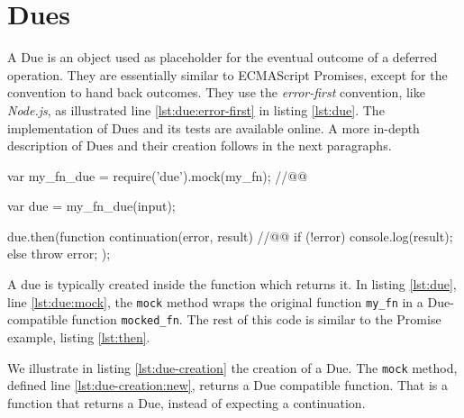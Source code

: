 \section{Dues} \label{chapter5:dues}


A Due is an object used as placeholder for the eventual outcome of a deferred operation.
They are essentially similar to ECMAScript Promises, except for the convention to hand back outcomes.
They use the \textit{error-first} convention, like \textit{Node.js}, as illustrated line \ref{lst:due:error-first} in listing \ref{lst:due}.
The implementation of Dues and its tests are available online.
A more in-depth description of Dues and their creation follows in the next paragraphs.

\begin{code}[js, %
             caption={Example of a due}, %
             label={lst:due}] %
var my_fn_due = require('due').mock(my_fn); //@\label{lst:due:mock}@

var due = my_fn_due(input);

due.then(function continuation(error, result) { //@\label{lst:due:error-first}@
  if (!error) {
    console.log(result);
  } else {
    throw error;
  }
});
\end{code}

A due is typically created inside the function which returns it.
In listing \ref{lst:due}, line \ref{lst:due:mock}, the \texttt{mock} method wraps the original function \texttt{my\_fn} in a Due-compatible function \texttt{mocked\_fn}.
The rest of this code is similar to the Promise example, listing \ref{lst:then}.

We illustrate in listing \ref{lst:due-creation} the creation of a Due.
The \texttt{mock} method, defined line \ref{lst:due-creation:new}, returns a Due compatible function.
That is a function that returns a Due, instead of expecting a continuation.

